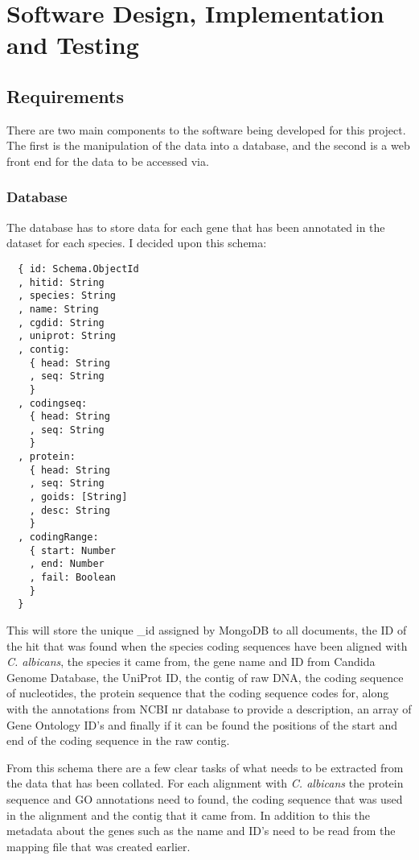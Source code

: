 \chapter{Software Design, Implementation and Testing}

% 

\section{Requirements}
There are two main components to the software being developed for this project. The first is the manipulation of the data into a database, and the second is a web front end for the data to be accessed via. 

\subsection{Database}
The database has to store data for each gene that has been annotated in the dataset for each species. I decided upon this schema:

\begin{lstlisting}
  { id: Schema.ObjectId
  , hitid: String
  , species: String
  , name: String
  , cgdid: String
  , uniprot: String
  , contig: 
    { head: String
    , seq: String 
    }
  , codingseq: 
    { head: String
    , seq: String 
    }
  , protein: 
    { head: String
    , seq: String
    , goids: [String]
    , desc: String 
    }
  , codingRange: 
    { start: Number
    , end: Number
    , fail: Boolean 
    }
  }
\end{lstlisting}

This will store the unique \_id assigned by MongoDB to all documents, the ID of the hit that was found when the species coding sequences have been aligned with \textit{C. albicans}, the species it came from, the gene name and ID from Candida Genome Database, the UniProt ID, the contig of raw DNA, the coding sequence of nucleotides, the protein sequence that the coding sequence codes for, along with the annotations from NCBI nr database to provide a description, an array of Gene Ontology\cite{geneontology} ID's and finally if it can be found the positions of the start and end of the coding sequence in the raw contig. 

From this schema there are a few clear tasks of what needs to be extracted from the data that has been collated. For each alignment with \textit{C. albicans} the protein sequence and GO annotations need to found, the coding sequence that was used in the alignment and the contig that it came from. In addition to this the metadata about the genes such as the name and ID's need to be read from the mapping file that was created earlier. 

